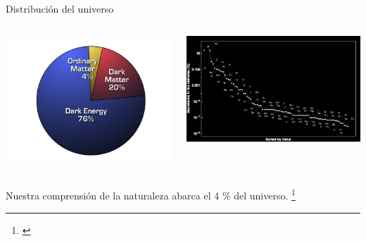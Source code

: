 \documentclass[handout]{beamer}
\newcommand\blfootnote[1]
{%
	\begingroup
	\renewcommand\thefootnote{}\footnote{#1}%
	\addtocounter{footnote}{-1}%
	\endgroup
}
\newcommand{\fcite}[1]{\blfootnote{\cite{#1}}}
\begin{document}
\begin{frame}{Distribución del universo}
	\begin{columns}
		\begin{column}{0.5\textwidth}
			\includegraphics[width=\linewidth]{sources/images/udist.jpg}
		\end{column}
		\begin{column}{0.5\textwidth}
			\includegraphics[width=\linewidth]{sources/images/edist.jpg}
		\end{column}
	\end{columns}
	\vspace{1cm}
	Nuestra comprensión de la naturaleza abarca el 4 \% del universo.
	\fcite{tegmark2006cosmological}
\end{frame}
\end{document}
